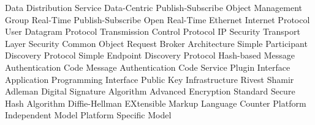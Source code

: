      {Data Distribution Service}
    {Data-Centric Publish-Subscribe}
     {Object Management Group}
    {Real-Time Publish-Subscribe}
    {Open Real-Time Ethernet}
      {Internet Protocol}
     {User Datagram Protocol}
     {Transmission Control Protocol}
   {IP Security}
     {Transport Layer Security}
   {Common Object Request Broker Architecture}
    {Simple Participant Discovery Protocol}
    {Simple Endpoint Discovery Protocol}
    {Hash-based Message Authentication Code}
     {Message Authentication Code}
     {Service Plugin Interface}
     {Application Programming Interface}
     {Public Key Infrastructure}
     {Rivest Shamir Adleman}
     {Digital Signature Algorithm}
     {Advanced Encryption Standard}
     {Secure Hash Algorithm}
      {Diffie-Hellman}
     {EXtensible Markup Language}
     {Counter}
     {Platform Independent Model}
     {Platform Specific Model}
